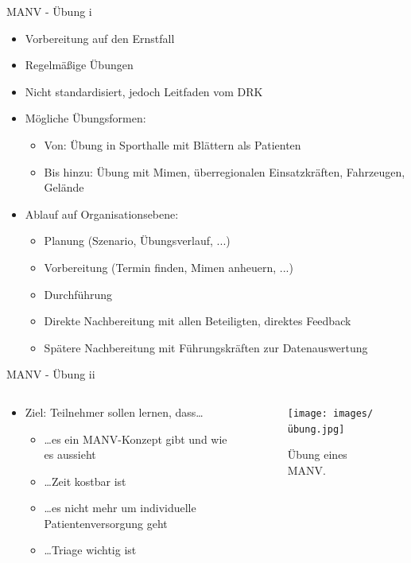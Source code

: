 \begin{frame}{MANV - Übung i}
	\begin{itemize}
		\item Vorbereitung auf den Ernstfall
		\item Regelmäßige Übungen
		\item Nicht standardisiert, jedoch Leitfaden vom DRK \cite{kreuz2016durchfuhrung}
		\item Mögliche Übungsformen:
		      \begin{itemize}
			      \item Von: Übung in Sporthalle mit Blättern als Patienten
			      \item Bis hinzu: Übung mit Mimen, überregionalen Einsatzkräften, Fahrzeugen, Gelände
		      \end{itemize}
		\item Ablauf auf Organisationsebene:
		      \begin{itemize}
			      \item Planung (Szenario, Übungsverlauf, ...)
			      \item Vorbereitung (Termin finden, Mimen anheuern, ...)
			      \item Durchführung
			      \item Direkte Nachbereitung mit allen Beteiligten, direktes Feedback
			      \item Spätere Nachbereitung mit Führungskräften zur Datenauswertung
		      \end{itemize}
	\end{itemize}

\end{frame}

\begin{frame}{MANV - Übung ii}
	\begin{columns}
		\begin{column}{0.7\textwidth}
			\begin{itemize}
				\item Ziel: Teilnehmer sollen lernen, dass\dots
				      \begin{itemize}
					      \item \dots es ein MANV-Konzept gibt und wie es aussieht
					      \item \dots Zeit kostbar ist
					      \item \dots es nicht mehr um individuelle Patientenversorgung geht
					      \item \dots Triage wichtig ist
				      \end{itemize}
			\end{itemize}
		\end{column}
		\begin{column}{0.3\textwidth}
			\begin{figure}
				\begin{center}
					\texttt{[image: images/übung.jpg]}
				\end{center}
				\caption{Übung eines MANV.\cite{manv1übung}}\label{fig:übung}
			\end{figure}
		\end{column}
	\end{columns}
\end{frame}
